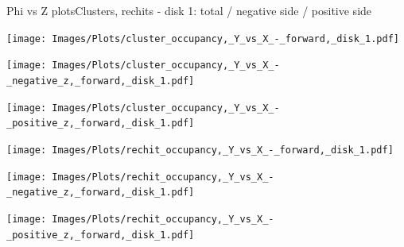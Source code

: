 \documentclass{beamer}
\begin{document}
\begin{frame}{Phi vs Z plots}{Clusters, rechits - disk 1: total / negative side / positive side}
  \hspace{0.01\textwidth}%
  \begin{minipage}{0.32\textwidth}
    \centering
    \texttt{[image: Images/Plots/cluster\_occupancy,\_Y\_vs\_X\_-\_forward,\_disk\_1.pdf]}
  \end{minipage}%
  \hspace{0.01\textwidth}%
  \begin{minipage}{0.32\textwidth}
    \centering
    \texttt{[image: Images/Plots/cluster\_occupancy,\_Y\_vs\_X\_-\_negative\_z,\_forward,\_disk\_1.pdf]}
  \end{minipage}
  \vspace*{0.2cm}
  \begin{minipage}{0.32\textwidth}
    \centering
    \texttt{[image: Images/Plots/cluster\_occupancy,\_Y\_vs\_X\_-\_positive\_z,\_forward,\_disk\_1.pdf]}
  \end{minipage}
  \hspace{0.01\textwidth}%
  \begin{minipage}{0.32\textwidth}
    \centering
    \texttt{[image: Images/Plots/rechit\_occupancy,\_Y\_vs\_X\_-\_forward,\_disk\_1.pdf]}
  \end{minipage}%
  \hspace{0.01\textwidth}%
  \begin{minipage}{0.32\textwidth}
    \centering
    \texttt{[image: Images/Plots/rechit\_occupancy,\_Y\_vs\_X\_-\_negative\_z,\_forward,\_disk\_1.pdf]}
  \end{minipage}
  \vspace*{0.2cm}
  \begin{minipage}{0.32\textwidth}
    \centering
    \texttt{[image: Images/Plots/rechit\_occupancy,\_Y\_vs\_X\_-\_positive\_z,\_forward,\_disk\_1.pdf]}
  \end{minipage}
\end{frame}
\end{document}
